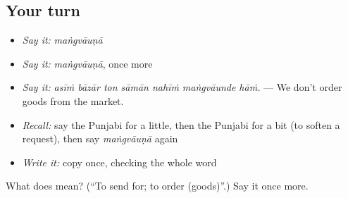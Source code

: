\subsection*{Your turn}
\begin{itemize}
\raggedright
  \item \emph{Say it:} \emph{maṅgvāuṇā}
  \item \emph{Say it:} \emph{maṅgvāuṇā}, once more
  \item \emph{Say it:} \emph{asīṁ bāzār ton sāmān nahīṁ maṅgvāunde hāṁ.} — We don't order goods from the market.
  \item \emph{Recall:} say the Punjabi for a little, then the Punjabi for a bit (to soften a request), then say \emph{maṅgvāuṇā} again
  \item \emph{Write it:} copy \textbf{} once, checking the whole word
\end{itemize}

\begin{tcolorbox}[breakable,colback=teal!4,colframe=teal!35!black,title={Before you move on}]
What does  mean? (\textquotedblleft{}To send for; to order (goods)\textquotedblright{}.) Say it once more.
\end{tcolorbox}
